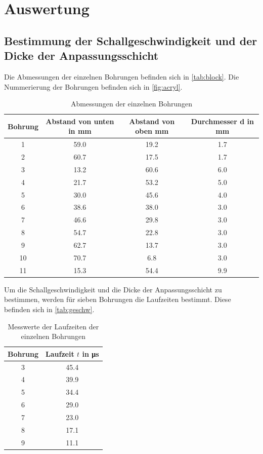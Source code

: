 \section{Auswertung}
\label{s:Auswertung}


\subsection{Bestimmung der Schallgeschwindigkeit und der Dicke der Anpassungsschicht}
Die Abmessungen der einzelnen Bohrungen befinden sich in \autoref{tab:block}. Die Nummerierung der Bohrungen befinden sich in \autoref{fig:acryl}.
\begin{table}
    \centering 
    \caption{Abmessungen der einzelnen Bohrungen}
\begin{tabular}{c c c c}
    \toprule
    Bohrung & Abstand von unten in \unit{\mm} & Abstand von oben \unit{\mm} & Durchmesser d in \unit{\mm}\\
    \midrule
    1&59.0&19.2&1.7 \\
     2&60.7&17.5&1.7 \\
     3&13.2&60.6&6.0 \\
     4&21.7&53.2&5.0 \\
     5&30.0&45.6&4.0 \\
     6&38.6&38.0&3.0 \\
     7&46.6&29.8&3.0 \\
     8&54.7&22.8&3.0 \\
     9&62.7&13.7&3.0 \\
     10&70.7&6.8&3.0 \\
    11&15.3&54.4&9.9 \\
    \bottomrule
    \end{tabular}
    \label{tab:block}
\end{table}

Um die Schallgeschwindigkeit und die Dicke der Anpassungsschicht zu bestimmen, werden für sieben Bohrungen die Laufzeiten bestimmt. Diese befinden 
sich in \autoref{tab:geschw}.

\begin{table}
    \centering 
    \caption{Messwerte der Laufzeiten der einzelnen Bohrungen}
\begin{tabular}{c c}
    \toprule
    Bohrung & Laufzeit $t$ in \unit{\micro\s}\\
    \midrule
    3&45.4 \\
      4&39.9 \\
      5&34.4 \\
      6&29.0 \\
      7&23.0 \\
      8&17.1 \\
      9&11.1 \\
      \bottomrule
    \end{tabular}
    \label{tab:geschw}
\end{table}

